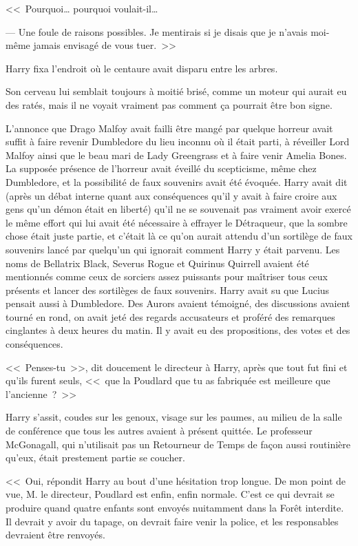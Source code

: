 <<~Pourquoi… pourquoi voulait-il…

--- Une foule de raisons possibles. Je mentirais si je disais que je n'avais moi-même jamais envisagé de vous tuer.~>>

Harry fixa l'endroit où le centaure avait disparu entre les arbres.

Son cerveau lui semblait toujours à moitié brisé, comme un moteur qui aurait eu des ratés, mais il ne voyait vraiment pas comment ça pourrait être bon signe.

\later

L'annonce que Drago Malfoy avait failli être mangé par quelque horreur avait suffit à faire revenir Dumbledore du lieu inconnu où il était parti, à réveiller Lord Malfoy ainsi que le beau mari de Lady Greengrass et à faire venir Amelia Bones. La supposée présence de l'horreur avait éveillé du scepticisme, même chez Dumbledore, et la possibilité de faux souvenirs avait été évoquée. Harry avait dit (après un débat interne quant aux conséquences qu'il y avait à faire croire aux gens qu'un démon était en liberté) qu'il ne se souvenait pas vraiment avoir exercé le même effort qui lui avait été nécessaire à effrayer le Détraqueur, que la sombre chose était juste partie, et c'était là ce qu'on aurait attendu d'un sortilège de faux souvenirs lancé par quelqu'un qui ignorait comment Harry y était parvenu. Les noms de Bellatrix Black, Severus Rogue et Quirinus Quirrell avaient été mentionnés comme ceux de sorciers assez puissants pour maîtriser tous ceux présents et lancer des sortilèges de faux souvenirs. Harry avait su que Lucius pensait aussi à Dumbledore. Des Aurors avaient témoigné, des discussions avaient tourné en rond, on avait jeté des regards accusateurs et proféré des remarques cinglantes à deux heures du matin. Il y avait eu des propositions, des votes et des conséquences.

<<~Penses-tu~>>, dit doucement le directeur à Harry, après que tout fut fini et qu'ils furent seuls, <<~que la Poudlard que tu as fabriquée est meilleure que l'ancienne~?~>>

Harry s'assit, coudes sur les genoux, visage sur les paumes, au milieu de la salle de conférence que tous les autres avaient à présent quittée. Le professeur McGonagall, qui n'utilisait pas un Retourneur de Temps de façon aussi routinière qu'eux, était prestement partie se coucher.

<<~Oui, répondit Harry au bout d'une hésitation trop longue. De mon point de vue, M. le directeur, Poudlard est enfin, enfin normale. C'est ce qui devrait se produire quand quatre enfants sont envoyés nuitamment dans la Forêt interdite. Il devrait y avoir du tapage, on devrait faire venir la police, et les responsables devraient être renvoyés.

